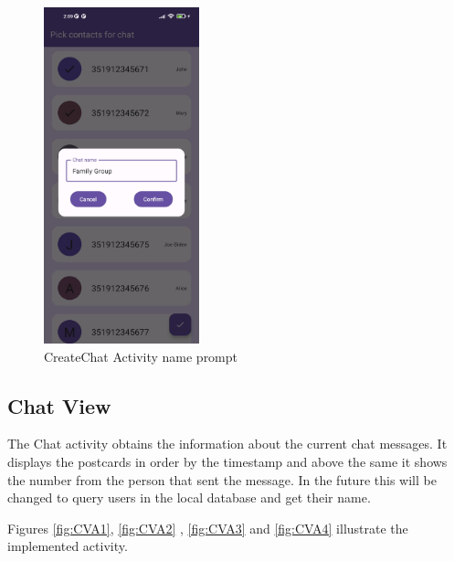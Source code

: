 \begin{figure}[!ht]
	\centering
	\includegraphics[trim={0cm -3cm 0 -3cm}, width=0.4\textwidth]{./Chapter6/Figures/Create Chat Name}
	\caption{CreateChat Activity name prompt}
	\label{fig:CCA2}
\end{figure}

\subsection{Chat View}
The Chat activity obtains the information about the current chat messages. 
It displays the postcards in order by the timestamp and above the same it shows the number from the person that sent the message. In the future this will be changed to query users in the local database and get their name.  

Figures \ref{fig:CVA1}, \ref{fig:CVA2} , \ref{fig:CVA3} and \ref{fig:CVA4} illustrate the implemented activity.

